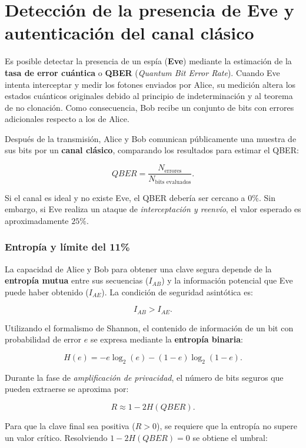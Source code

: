 \documentclass[12pt]{article}
\begin{document}
\section{Detección de la presencia de Eve y autenticación del canal clásico}

Es posible detectar la presencia de un espía (\textbf{Eve}) mediante la estimación de la 
\textbf{tasa de error cuántica} o \textbf{QBER} (\textit{Quantum Bit Error Rate}). 
Cuando Eve intenta interceptar y medir los fotones enviados por Alice, 
su medición altera los estados cuánticos originales debido al principio de indeterminación 
y al teorema de no clonación. Como consecuencia, Bob recibe un conjunto de bits con 
errores adicionales respecto a los de Alice.

Después de la transmisión, Alice y Bob comunican públicamente una muestra de sus bits 
por un \textbf{canal clásico}, comparando los resultados para estimar el QBER:

\[
QBER = \frac{N_{\text{errores}}}{N_{\text{bits\ evaluados}}}.
\]

Si el canal es ideal y no existe Eve, el QBER debería ser cercano a $0\%$.  
Sin embargo, si Eve realiza un ataque de \textit{interceptación y reenvío}, 
el valor esperado es aproximadamente $25\%$.

\subsubsection*{Entropía y límite del 11\%}

La capacidad de Alice y Bob para obtener una clave segura depende de la 
\textbf{entropía mutua} entre sus secuencias ($I_{AB}$) y la información potencial 
que Eve puede haber obtenido ($I_{AE}$).  
La condición de seguridad asintótica es:

\[
I_{AB} > I_{AE}.
\]

Utilizando el formalismo de Shannon, el contenido de información de un bit con 
probabilidad de error $e$ se expresa mediante la \textbf{entropía binaria}:

\[
H(e) = -e \log_2(e) - (1-e)\log_2(1-e).
\]

Durante la fase de \textit{amplificación de privacidad}, el número de bits seguros que pueden 
extraerse se aproxima por:

\[
R \approx 1 - 2H(QBER).
\]

Para que la clave final sea positiva ($R > 0$), se requiere que la entropía no supere un 
valor crítico. Resolviendo $1 - 2H(QBER) = 0$ se obtiene el umbral:
\end{document}
